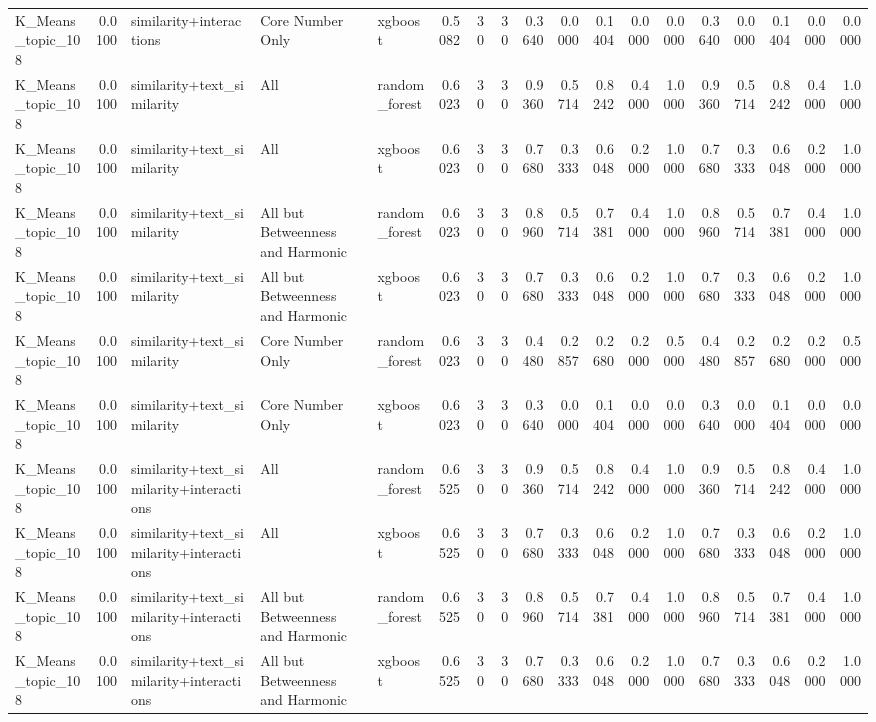 \begin{tabular}{lrlllrrrrrrrrrrrrr}
K_Means_topic_108 & 0.0100 & similarity+interactions & Core Number Only & xgboost & 0.5082 & 30 & 30 & 0.3640 & 0.0000 & 0.1404 & 0.0000 & 0.0000 & 0.3640 & 0.0000 & 0.1404 & 0.0000 & 0.0000 \\
K_Means_topic_108 & 0.0100 & similarity+text_similarity & All & random_forest & 0.6023 & 30 & 30 & 0.9360 & 0.5714 & 0.8242 & 0.4000 & 1.0000 & 0.9360 & 0.5714 & 0.8242 & 0.4000 & 1.0000 \\
K_Means_topic_108 & 0.0100 & similarity+text_similarity & All & xgboost & 0.6023 & 30 & 30 & 0.7680 & 0.3333 & 0.6048 & 0.2000 & 1.0000 & 0.7680 & 0.3333 & 0.6048 & 0.2000 & 1.0000 \\
K_Means_topic_108 & 0.0100 & similarity+text_similarity & All but Betweenness and Harmonic & random_forest & 0.6023 & 30 & 30 & 0.8960 & 0.5714 & 0.7381 & 0.4000 & 1.0000 & 0.8960 & 0.5714 & 0.7381 & 0.4000 & 1.0000 \\
K_Means_topic_108 & 0.0100 & similarity+text_similarity & All but Betweenness and Harmonic & xgboost & 0.6023 & 30 & 30 & 0.7680 & 0.3333 & 0.6048 & 0.2000 & 1.0000 & 0.7680 & 0.3333 & 0.6048 & 0.2000 & 1.0000 \\
K_Means_topic_108 & 0.0100 & similarity+text_similarity & Core Number Only & random_forest & 0.6023 & 30 & 30 & 0.4480 & 0.2857 & 0.2680 & 0.2000 & 0.5000 & 0.4480 & 0.2857 & 0.2680 & 0.2000 & 0.5000 \\
K_Means_topic_108 & 0.0100 & similarity+text_similarity & Core Number Only & xgboost & 0.6023 & 30 & 30 & 0.3640 & 0.0000 & 0.1404 & 0.0000 & 0.0000 & 0.3640 & 0.0000 & 0.1404 & 0.0000 & 0.0000 \\
K_Means_topic_108 & 0.0100 & similarity+text_similarity+interactions & All & random_forest & 0.6525 & 30 & 30 & 0.9360 & 0.5714 & 0.8242 & 0.4000 & 1.0000 & 0.9360 & 0.5714 & 0.8242 & 0.4000 & 1.0000 \\
K_Means_topic_108 & 0.0100 & similarity+text_similarity+interactions & All & xgboost & 0.6525 & 30 & 30 & 0.7680 & 0.3333 & 0.6048 & 0.2000 & 1.0000 & 0.7680 & 0.3333 & 0.6048 & 0.2000 & 1.0000 \\
K_Means_topic_108 & 0.0100 & similarity+text_similarity+interactions & All but Betweenness and Harmonic & random_forest & 0.6525 & 30 & 30 & 0.8960 & 0.5714 & 0.7381 & 0.4000 & 1.0000 & 0.8960 & 0.5714 & 0.7381 & 0.4000 & 1.0000 \\
K_Means_topic_108 & 0.0100 & similarity+text_similarity+interactions & All but Betweenness and Harmonic & xgboost & 0.6525 & 30 & 30 & 0.7680 & 0.3333 & 0.6048 & 0.2000 & 1.0000 & 0.7680 & 0.3333 & 0.6048 & 0.2000 & 1.0000 \\

\end{tabular}
